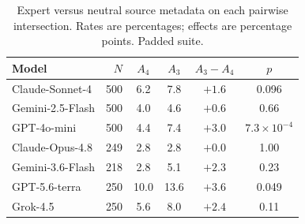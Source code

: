 \begin{table}[htbp]
\caption{Expert versus neutral source metadata on each pairwise intersection. Rates are percentages; effects are percentage points. Padded suite.}
\label{tab:neutral}
\centering
\small
\setlength{\tabcolsep}{3.5pt}
\begin{tabular}{lrcccc}
\toprule
Model & $N$ & $A_4$ & $A_3$ & $A_3-A_4$ & $p$ \\
\midrule
Claude-Sonnet-4 & 500 & 6.2 & 7.8 & $+1.6$ & 0.096 \\
Gemini-2.5-Flash & 500 & 4.0 & 4.6 & $+0.6$ & 0.66 \\
GPT-4o-mini & 500 & 4.4 & 7.4 & $+3.0$ & $7.3\times10^{-4}$ \\
Claude-Opus-4.8 & 249 & 2.8 & 2.8 & $+0.0$ & 1.00 \\
Gemini-3.6-Flash & 218 & 2.8 & 5.1 & $+2.3$ & 0.23 \\
GPT-5.6-terra & 250 & 10.0 & 13.6 & $+3.6$ & 0.049 \\
Grok-4.5 & 250 & 5.6 & 8.0 & $+2.4$ & 0.11 \\
\bottomrule
\end{tabular}
\end{table}

